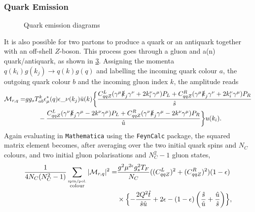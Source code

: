 \documentclass[../main.tex]{subfiles}
\begin{document}
\subsubsection*{Quark Emission}
\begin{figure}[ht!]
  \centering
  \begin{subfigure}{0.49\textwidth}
    \centering
    \caption{}
    \label{pc:subfig:quark_emission_s}
  \end{subfigure}
  \begin{subfigure}{0.49\textwidth}
    \centering
    \caption{}
    \label{pc:subfig:quark_emission_t}
  \end{subfigure}
  \caption{Quark emission diagrams}
  \label{pc:fig:quark_emission}
\end{figure}
It is also possible for two partons to produce a quark or an antiquark together with an off-shell \(Z\)-boson.
This process goes through a gluon and a(n) quark/antiquark, as shown in \cref{pc:fig:quark_emission}.
Assigning the momenta \(q(k_i) g(k_j) \to q(k) g(q)\) and labelling the incoming quark colour \(a\), the outgoing quark colour \(b\) and the incoming gluon index \(k\), the amplitude reads
\begin{align}
  \nonumber
  \M_{r,q} = & g g_s T_{ab}^k \epsilon_\mu^\ast(q) \epsilon\_\nu(k_j) \bar{u}(k) \biggl\{
  \frac{C_{qqZ}^L (\gamma\^\mu \slashed{k}_j \gamma\^\nu + 2k_i^\nu \gamma\^\mu )P_L + C_{qqZ}^R (\gamma\^\mu \slashed{k}_j \gamma\^\nu + 2k_i^\nu \gamma\^\mu )P_R }{\hat{s}}                     \\
             & \qquad - \frac{C_{qqZ}^L (\gamma\^\nu \slashed{k}_j \gamma\^\mu - 2k\^\nu \gamma\^\mu )P_L + C_{qqZ}^R (\gamma\^\nu \slashed{k}_j \gamma\^\mu - 2k\^\nu \gamma\^\mu )P_R }{\hat{u}}
  \biggr\}u(k_i).
\end{align}
Again evaluating in \verb|Mathematica| using the \verb|FeynCalc| package, the squared matrix element becomes, after averaging over the two initial quark spins and \(N_C\) colours, and two initial gluon polarisations and \(N_C^2-1\) gluon states,
\begin{align}
  \nonumber
  \frac{1}{4N_C(N_C^2-1)} \sum_{\stackrel{\text{spin/pol.}}{\text{colour}}}|\mathcal{M}_{r,q}|^2 = & \frac{g^2 \mu^{2\epsilon} g_s^2 T_F}{N_C} ((C_{qqZ}^L)^2 + (C_{qqZ}^R)^2) (1-\epsilon) \\
                                                                                          & \times\Bigl\{
  -\frac{2Q^2 \hat{t}}{\hat{s} \hat{u}} + 2\epsilon - (1-\epsilon)\left(\frac{\hat{s}}{\hat{u}} + \frac{\hat{u}}{\hat{s}}\right)
  \Bigr\},
\end{align}
\end{document}
